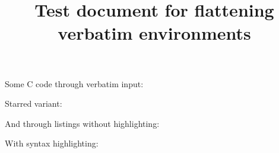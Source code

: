 \documentclass{article}
\title{Test document for flattening verbatim environments}
\begin{document}
\noindent Some C code through verbatim input:

\noindent Starred variant:



\noindent And through listings without highlighting:


\noindent With syntax highlighting:

\end{document}
